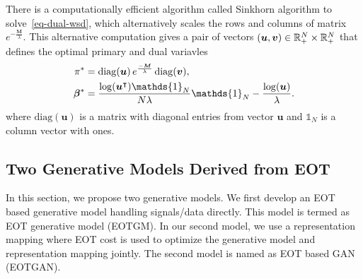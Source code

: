 There is a computationally efficient algorithm called Sinkhorn
algorithm\cite{2013arXiv1306.0895C, 2013arXiv1310.4375C} to
solve~\eqref{eq-dual-wsd}, which alternatively scales the rows and columns of matrix $e^{-\frac{\bm{M}}{\lambda}}$. This alternative computation gives a pair of vectors $(\bm{u}, \bm{v}) \in \mathbb{R}^N_{+} \times \mathbb{R}^N_{+}$ that defines the optimal primary and dual variavles \cite[Proposition~2]{2013arXiv1310.4375C} 
\begin{align}\label{eq-dual-opt}
  \pi^{\ast} &=
               \mathrm{diag}(\bm{u}) \, e^{\frac{-\bm{M}}{\la}} \, \mathrm{diag}(\bm{v}),  \nonumber \\
  \bm{\beta}^{\ast} &= \frac{\log(\bm{u}^{\intercal})\mathds{1}_N}{N\la} \mathds{1}_N -\frac{\log(\bm{u})}{\la}.
\end{align}
where $\mathrm{diag}(\bm{u})$ is a matrix with diagonal entries from vector $\bm{u}$ and $\mathds{1}_N$ is a column vector with ones.


\subsection{Two Generative Models Derived from EOT}

In this section, we propose two generative models.
We first develop an EOT based generative model handling signals/data directly. This model is termed as EOT generative model (EOTGM). 
In our second model, we use a
representation mapping where EOT cost is used to optimize the
generative model and representation mapping jointly. The second model is named as EOT based GAN (EOTGAN).

